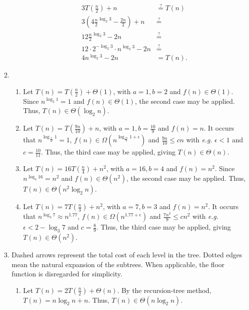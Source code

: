 \documentclass[12pt]{article}
\begin{document}
\begin{enumerate}
\begin{enumerate}
        \begin{align*}
            3T(\tfrac{n}{2}) + n &\stackrel{?}{=} T(n) \\
            3(4\tfrac{n}{2}^{\log_{2} 3} - \tfrac{2n}{2}) + n &\stackrel{?}{=} \\
            12\tfrac{n}{2}^{\log_{2} 3} - 2n &\stackrel{?}{=} \\
            12 \cdot 2^{-\log_2 3} \cdot n^{\log_2 3} - 2n &\stackrel{?}{=} \\
            4n^{\log_{2} 3} - 2n &= T(n).
        \end{align*}
    \end{enumerate}
    \item
    \begin{enumerate}
        \item Let $T(n) = T(\frac{n}{2}) + \Theta(1)$, with $a = 1, b = 2$ and $f(n) \in \Theta(1)$. Since $n^{\log_{2} 1} = 1$ and $f(n) \in \Theta(1)$, the second case may be applied. Thus, $T(n) \in \Theta(\log_{2} n)$.
        \item Let $T(n) = T(\frac{9n}{10}) + n$, with $a = 1, b = \frac{10}{9}$ and $f(n) = n$. It occurs that $n^{\log_{\frac{9}{10}} 1} = 1$, $f(n) \in \Omega(n^{\log_{\frac{10}{9}} 1 + \epsilon})$ and $\frac{9n}{10} \leq cn$ with \emph{e.g.} $\epsilon < 1$ and $c = \frac{10}{11}$. Thus, the third case may be applied, giving $T(n) \in \Theta(n)$.
        \item Let $T(n) = 16T(\frac{n}{4}) + n^{2}$, with $a = 16, b = 4$ and $f(n) = n^{2}$. Since $n^{\log_{4} 16} = n^{2}$ and $f(n) \in \Theta(n^{2})$, the second case may be applied. Thus, $T(n) \in \Theta(n^{2} \log_{2} n)$.
        \item Let $T(n) = 7T(\frac{n}{3}) + n^{2}$, with $a = 7, b = 3$ and $f(n) = n^{2}$. It occurs that $n^{\log_{3} 7} \approx n^{1.77}$, $f(n) \in \Omega(n^{1.77 + \epsilon})$ and $\frac{7n^{2}}{9} \leq cn^{2}$ with \emph{e.g.} $\epsilon < 2 - \log_3 7$ and $c = \frac{8}{9}$. Thus, the third case may be applied, giving $T(n) \in \Theta(n^{2})$.
    \end{enumerate}
    \item Dashed arrows represent the total cost of each level in the tree. Dotted edges mean the natural expansion of the subtrees. When applicable, the floor function is disregarded for simplicity.
    \begin{enumerate}
        \item Let $T(n) = 2T(\frac{n}{2}) + \Theta(n)$. By the recursion-tree method, $T(n) = n \log_{2} n + n$. Thus, $T(n) \in \Theta(n \log_2 n)$.

\end{enumerate}
\end{enumerate}
\end{document}
